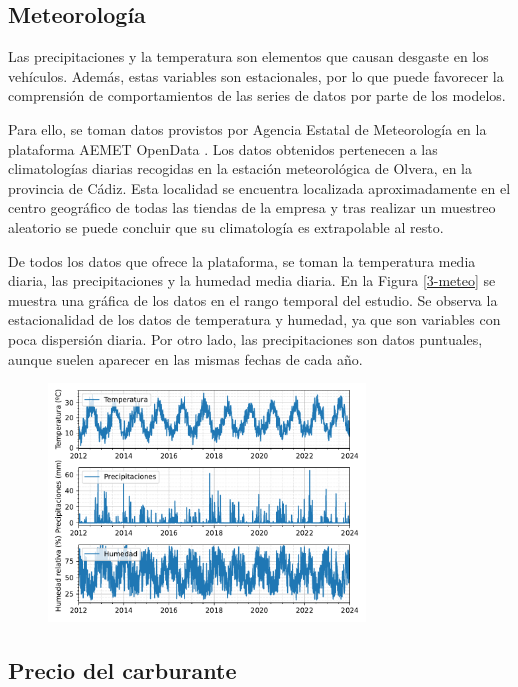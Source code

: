 \subsection{Meteorología}

Las precipitaciones y la temperatura son elementos que causan desgaste en los vehículos. Además, estas variables son estacionales, por lo que puede favorecer la comprensión de comportamientos de las series de datos por parte de los modelos.

Para ello, se toman datos provistos por Agencia Estatal de Meteorología en la plataforma AEMET OpenData \cite{aemet}. Los datos obtenidos pertenecen a las climatologías diarias recogidas en la estación meteorológica de Olvera, en la provincia de Cádiz. Esta localidad se encuentra localizada aproximadamente en el centro geográfico de todas las tiendas de la empresa y tras realizar un muestreo aleatorio se puede concluir que su climatología es extrapolable al resto.

De todos los datos que ofrece la plataforma, se toman la temperatura media diaria, las precipitaciones y la humedad media diaria. En la Figura \ref*{3-meteo} se muestra una gráfica de los datos en el rango temporal del estudio. Se observa la estacionalidad de los datos de temperatura y humedad, ya que son variables con poca dispersión diaria. Por otro lado, las precipitaciones son datos puntuales, aunque suelen aparecer en las mismas fechas de cada año.

\begin{figure}[H]
	{\includegraphics[width=0.75\textwidth]{imagenes/grafica_meteo.pdf}}
\end{figure}


\subsection{Precio del carburante}

